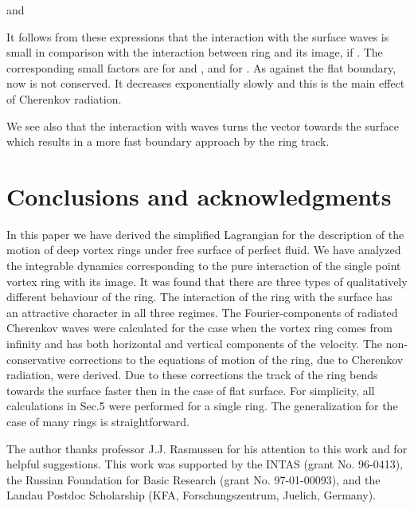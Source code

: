 and


It follows from these expressions that the interaction with 
the surface waves is small in comparison with the 
interaction between ring and its image, if . The corresponding 
small factors are  for  and , and  for .
As against the flat boundary, now  is not conserved. 
It decreases exponentially slowly and this is the main effect of Cherenkov
radiation.

We see also that the interaction with waves turns the vector  
towards the surface which results in a more fast boundary approach 
by the ring track. 



\section{Conclusions and acknowledgments}

In this paper we have derived the simplified Lagrangian for the description
of the motion of deep vortex rings under free surface of perfect fluid. 
We have analyzed the integrable dynamics corresponding to the pure
interaction of the single point vortex ring with its image. It was found that
there are three types of qualitatively different behaviour of the ring. 
The interaction of the ring with the surface has an attractive
character in all three regimes.
The Fourier-components of radiated Cherenkov waves were calculated
for the case when the vortex ring comes from infinity and has both horizontal 
and vertical components of the velocity. The non-conservative corrections 
to the equations of motion of the ring, due to Cherenkov radiation, 
were derived. Due to these corrections the track of the ring bends towards
the surface faster then in the case of flat surface.
For simplicity, all calculations in Sec.5 were performed 
for a single ring. The generalization for the case of many 
rings is straightforward.



\medskip

The author thanks professor J.J. Rasmussen for his attention to this 
work and for helpful suggestions. 
This work was supported by the INTAS (grant No. 96-0413),
the Russian Foundation for Basic Research (grant No. 97-01-00093), 
and the Landau Postdoc Scholarship (KFA, Forschungszentrum, Juelich, Germany).





